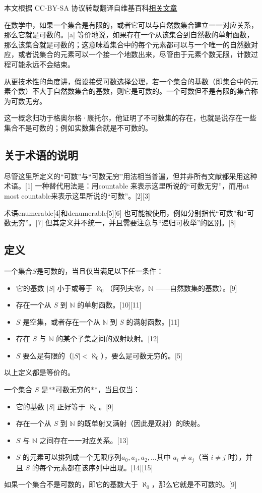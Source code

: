 
本文根据 CC-BY-SA 协议转载翻译自维基百科\href{https://en.wikipedia.org/wiki/Countable_set}{相关文章}

在数学中，如果一个集合是有限的，或者它可以与自然数集合建立一一对应关系，那么它就是可数的。[a] 等价地说，如果存在一个从该集合到自然数的单射函数，那么该集合就是可数的；这意味着集合中的每个元素都可以与一个唯一的自然数对应，或者说集合的元素可以一个接一个地数出来，尽管由于元素个数无限，计数过程可能永远不会结束。

从更技术性的角度讲，假设接受可数选择公理，若一个集合的基数（即集合中的元素个数）不大于自然数集合的基数，则它是可数的。一个可数但不是有限的集合称为可数无穷。

这一概念归功于格奥尔格·康托尔，他证明了不可数集的存在，也就是说存在一些集合不是可数的；例如实数集合就是不可数的。
\subsection{关于术语的说明}
尽管这里所定义的“可数”与“可数无穷”用法相当普遍，但并非所有文献都采用这种术语。[1] 一种替代用法是：用countable 来表示这里所说的“可数无穷”，而用at most countable来表示这里所说的“可数”。[2][3]

术语enumerable[4]和denumerable[5][6] 也可能被使用，例如分别指代“可数”和“可数无穷”。[7] 但其定义并不统一，并且需要注意与“递归可枚举”的区别。[8]
\subsection{定义}
一个集合$S$是可数的，当且仅当满足以下任一条件：
\begin{itemize}
\item 它的基数 $|S|$ 小于或等于 $\aleph_{0}$（阿列夫零，$\mathbb{N}$ ——自然数集的基数）。[9]
\item 存在一个从 $S$ 到 $\mathbb{N}$ 的单射函数。[10][11]
\item $S$ 是空集，或者存在一个从 $\mathbb{N}$ 到 $S$ 的满射函数。[11]
\item 存在 $S$ 与 $\mathbb{N}$ 的某个子集之间的双射映射。[12]
\item $S$ 要么是有限的（$|S| < \aleph_{0}$），要么是可数无穷的。[5]
\end{itemize}
以上定义都是等价的。

一个集合 $S$ 是**可数无穷的**，当且仅当：
\begin{itemize}
\item 它的基数 $|S|$ 正好等于 $\aleph_{0}$。[9]
\item 存在一个从 $S$ 到 $\mathbb{N}$ 的既单射又满射（因此是双射）的映射。
\item $S$ 与 $\mathbb{N}$ 之间存在一一对应关系。[13]
\item $S$ 的元素可以排列成一个无限序列$a_{0}, a_{1}, a_{2}, \ldots$其中 $a_i \neq a_j$（当 $i \neq j$ 时），并且 $S$ 的每个元素都在该序列中出现。[14][15]
\end{itemize}
如果一个集合不是可数的，即它的基数大于 $\aleph_{0}$，那么它就是不可数的。[9]
